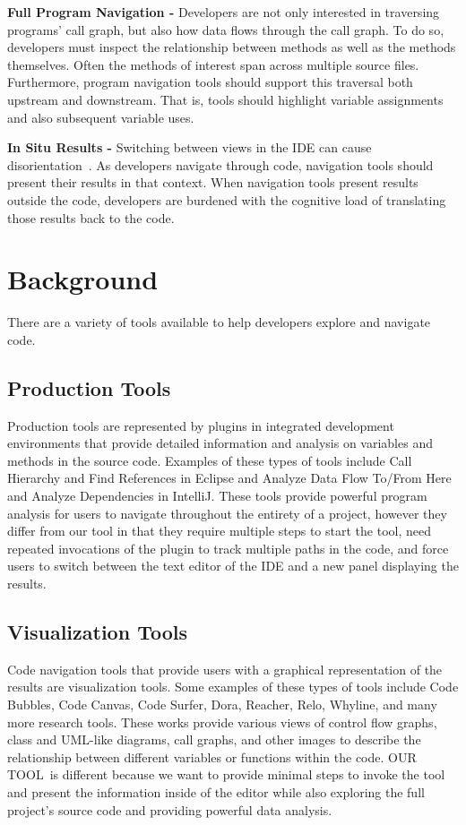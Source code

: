 \documentclass[conference]{IEEEtran}
\newcommand{\toolName}{OUR TOOL}
\begin{document}
\vspace{1em} 
\noindent\textbf{Full Program Navigation -}
Developers are not only interested in traversing programs' call graph, but also how data flows through the call graph.
To do so, developers must inspect the relationship between methods as well as the methods themselves.
Often the methods of interest span across multiple source files.
Furthermore, program navigation tools should support this traversal both upstream and downstream. 
That is, tools should highlight variable assignments and also subsequent variable uses. 

\vspace{1em} 
\noindent\textbf{In Situ Results -}
Switching between views in the IDE can cause disorientation~\cite{deAlwis2006disorient}. As developers navigate through code, navigation tools should present their results in that context. 
When navigation tools present results outside the code, developers are burdened with the cognitive load of translating those results back to the code.


\section{Background}
There are a variety of tools available to help developers explore and navigate code.
\subsection{Production Tools}
Production tools are represented by plugins in integrated development environments that provide detailed information and analysis on variables and methods in the source code. Examples of these types of tools include Call Hierarchy and Find References in Eclipse and Analyze Data Flow To/From Here and Analyze Dependencies in IntelliJ. These tools provide powerful program analysis for users to navigate throughout the entirety of a project, however they differ from our tool in that they require multiple steps to start the tool, need repeated invocations of the plugin to track multiple paths in the code, and force users to switch between the text editor of the IDE and a new panel displaying the results.

\subsection{Visualization Tools}
Code navigation tools that provide users with a graphical representation of the results are visualization tools. Some examples of these types of tools include Code Bubbles, Code Canvas, Code Surfer, Dora, Reacher, Relo, Whyline, and many more research tools. These works provide various views of control flow graphs, class and UML-like diagrams, call graphs, and other images to describe the relationship between different variables or functions within the code. \toolName~is different because we want to provide minimal steps to invoke the tool and present the information inside of the editor while also exploring the full project's source code and providing powerful data analysis.
\end{document}
